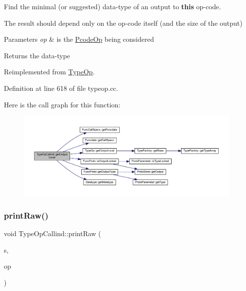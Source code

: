 Find the minimal (or suggested) data-\/type of an output to {\bfseries{this}} op-\/code. 

The result should depend only on the op-\/code itself (and the size of the output) 
\begin{DoxyParams}{Parameters}
{\em op} & is the \mbox{\hyperlink{class_pcode_op}{Pcode\+Op}} being considered \\
\hline
\end{DoxyParams}
\begin{DoxyReturn}{Returns}
the data-\/type 
\end{DoxyReturn}


Reimplemented from \mbox{\hyperlink{class_type_op_a3454cadfb15f6794829123a7ecfe38f5}{Type\+Op}}.



Definition at line 618 of file typeop.\+cc.

Here is the call graph for this function\+:
\nopagebreak
\begin{figure}[H]
\begin{center}
\leavevmode
\includegraphics[width=350pt]{class_type_op_callind_a41272ab087f4aacf6c3434911bbc055e_cgraph}
\end{center}
\end{figure}
\mbox{\label{class_type_op_callind_afab872c8d49a043fb21a0a10ace10507}} 
\subsubsection{\texorpdfstring{printRaw()}{printRaw()}}
{\footnotesize\ttfamily void Type\+Op\+Callind\+::print\+Raw (\begin{DoxyParamCaption}\item[{ostream \&}]{s,  }\item[{const \mbox{\hyperlink{class_pcode_op}{Pcode\+Op}} $\ast$}]{op }\end{DoxyParamCaption})\hspace{0.3cm}{\ttfamily [virtual]}}



